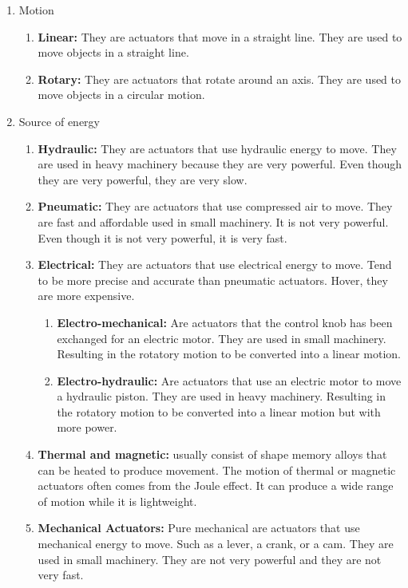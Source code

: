 \documentclass[runningheads]{llncs}
\begin{document}
\begin{enumerate}
    \item Motion\cite{RobotsYuk2017hydraulic,Near1996Piezoelectric}
    \begin{enumerate}
        \item \textbf{Linear:} They are actuators that move in a straight line. They are used to move objects in a straight line. 
        \item \textbf{Rotary:} They are actuators that rotate around an axis. They are used to move objects in a circular motion.
    \end{enumerate}
    \item Source of energy\cite{RobotsYuk2017hydraulic,Near1996Piezoelectric}
    \begin{enumerate}
        \item \textbf{Hydraulic: } They are actuators that use hydraulic energy to move. They are used in heavy machinery because they are very powerful. Even though they are very powerful, they are very slow.
        \item \textbf{Pneumatic:} They are actuators that use compressed air to move. They are fast and affordable used in small machinery. It is not very powerful. Even though it is not very powerful, it is very fast.
        \item \textbf{Electrical:} They are actuators that use electrical energy to move. Tend to be more precise and accurate than pneumatic actuators. Hover, they are more expensive.
        \begin{enumerate}
            \item \textbf{Electro-mechanical: } Are actuators that the control knob has been exchanged for an electric motor. They are used in small machinery. Resulting in the rotatory motion to be converted into a linear motion.
            \item \textbf{Electro-hydraulic: } Are actuators that use an electric motor to move a hydraulic piston. They are used in heavy machinery. Resulting in the rotatory motion to be converted into a linear motion but with more power.
        \end{enumerate}
        \item \textbf{Thermal and magnetic: }  usually consist of shape memory alloys that can be heated to produce movement. The motion of thermal or magnetic actuators often comes from the Joule effect. It can produce a wide range of motion while it is lightweight.
        \item \textbf{Mechanical Actuators: } Pure mechanical are actuators that use mechanical energy to move. Such as a lever, a crank, or a cam. They are used in small machinery. They are not very powerful and they are not very fast.
    \end{enumerate}
\end{enumerate}
\end{document}
